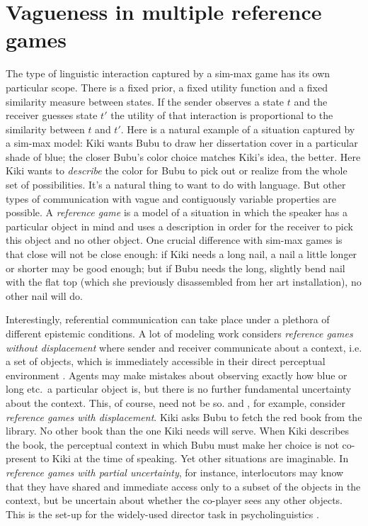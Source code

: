 \documentclass[a4paper]{article}
\begin{document}
\section{Vagueness in multiple reference games}
\label{sec:referential-vagueness}

The type of linguistic interaction captured by a sim-max game has its own particular scope.
There is a fixed prior, a fixed utility function and a fixed similarity measure between states. 
If the sender observes a state $t$ and the receiver guesses state $t'$ the utility of that interaction is proportional to the similarity between $t$ and $t'$.
Here is a natural example of a situation captured by a sim-max model: Kiki wants Bubu to draw her dissertation cover in a particular shade of blue; the closer Bubu's color choice matches Kiki's idea, the better. Here Kiki wants to \emph{describe} the color for Bubu to pick out or realize from the whole set of possibilities. 
It's a natural thing to want to do with language. 
But other types of communication with vague and contiguously variable properties are possible. 
A \emph{reference game} is a model of a situation in which the speaker has a particular object in mind and uses a description in order for the receiver to pick this object and no other object. 
One crucial difference with sim-max games is that close will not be close enough: if Kiki needs a long nail, a nail a little longer or shorter may be good enough; but if Bubu needs the long, slightly bend nail with the flat top (which she previously disassembled from her art installation), no other nail will do. 

Interestingly, referential communication can take place under a plethora of different epistemic conditions. 
A lot of modeling work considers \emph{reference games without displacement} where sender and receiver communicate about a context, i.e. a set of objects, which is immediately accessible in their direct perceptual environment \parencite[\emph{e.g.}][]{BaronchelliGong2010:Modeling-the-Em,Franke2012:Scales-Salience,Franke2012:On-Scales-Salie}.
Agents may make mistakes about observing exactly how blue or long etc.~a particular object is, but there is no further fundamental uncertainty about the context. 
This, of course, need not be so. \textcite{lipman_why_2009} and \textcite{Deemter2009:Utility-and-Lan}, for example, consider \emph{reference games with displacement}. 
Kiki asks Bubu to fetch the red book from the library. 
No other book than the one Kiki needs will serve. 
When Kiki describes the book, the perceptual context in which Bubu must make her choice is not co-present to Kiki at the time of speaking. 
Yet other situations are imaginable. 
In \emph{reference games with partial uncertainty}, for instance, interlocutors may know that they have shared and immediate access only to a subset of the objects in the context, but be uncertain about whether the co-player sees any other objects. 
This is the set-up for the widely-used director task in psycholinguistics \parencite[\emph{e.g.}][]{KraussGlucksberg1977:Social-and-nons,Keysar2000,KeyzarLin2003:Limits-on-Theor}.
\end{document}
